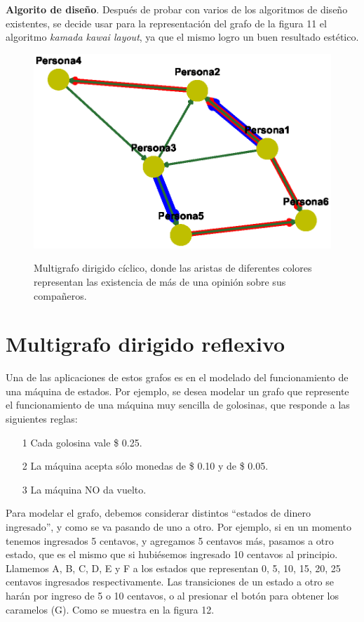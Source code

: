\documentclass{article}
\begin{document}
\textbf{Algorito de diseño}.\linebreak
Después de probar con varios de los algoritmos de diseño existentes, se decide usar para la representación del grafo de la figura 11 el algoritmo \textit{kamada kawai layout}, ya que el mismo logro un buen resultado estético.


\begin{center}

\end{center}
\begin{figure}[h]
\begin{center}
\includegraphics[scale=0.7]{Graf11_kamada_kawai_layout.eps}\\
\caption{Multigrafo dirigido cíclico, donde las aristas de diferentes colores representan las existencia de más de una opinión sobre sus compañeros.}
\end{center}
\end{figure}
\newpage
\section{Multigrafo dirigido reflexivo}
Una de las aplicaciones de estos grafos es en el modelado del funcionamiento de una máquina de estados.
Por ejemplo, se desea modelar un grafo que represente el funcionamiento de una máquina muy sencilla de golosinas, que responde a las siguientes reglas:

\begin{itemize}
\item[1] Cada golosina vale \$ 0.25.
\item[2] La máquina acepta sólo monedas de  \$ 0.10 y de \$ 0.05.
\item[3] La máquina NO da vuelto.
\end{itemize}
Para modelar el grafo, debemos considerar distintos “estados de dinero ingresado”, y como se va pasando de uno a otro. Por ejemplo, si en un momento tenemos ingresados 5 centavos, y agregamos 5 centavos más, pasamos a otro estado, que es el mismo que si hubiésemos ingresado 10 centavos al principio. Llamemos A, B, C, D, E y F a los estados que representan 0, 5, 10, 15, 20, 25 centavos ingresados respectivamente. Las transiciones de un estado a otro se harán por ingreso de 5 o 10 centavos, o al presionar el botón para obtener los caramelos (G). Como se muestra en la figura 12. \linebreak
\end{document}
